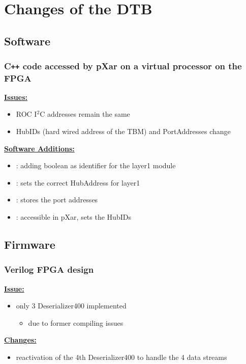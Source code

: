 \documentclass[9pt]{beamer}
\begin{document}
\section{Changes of the DTB}
\subsection{Software}
\begin{frame}
	\frametitle{C\texttt{++} code accessed by pXar on a virtual processor on the FPGA}
	\underline{\textbf{Issues:}}
	\begin{itemize}
		\setlength{\itemsep}{\fill}
		\item ROC I$^{2}$C addresses remain the same
		\item HubIDs (hard wired address of the TBM) and PortAddresses change
	\end{itemize}
	\vspace*{10pt}
	\underline{\textbf{Software Additions:}}
	\begin{itemize}
		\setlength{\itemsep}{\fill}
		\item {}: adding boolean as identifier for the layer1 module
		\item {}: sets the correct HubAddress for layer1
		\item {}: stores the port addresses
		\item {}: accessible in pXar, sets the HubIDs
	\end{itemize}
\end{frame}
\subsection{Firmware}
\begin{frame}
	\frametitle{Verilog FPGA design}
	\underline{\textbf{Issue:}}
	\begin{itemize}
		\item only $3$ Deserializer400 implemented
		\begin{itemize}
			\item due to former compiling issues
		\end{itemize}
	\end{itemize}
	\vspace*{10pt}
	\underline{\textbf{Changes:}}
	\begin{itemize}
		\item reactivation of the 4th Deserializer400 to handle the 4 data streams
	\end{itemize}
\end{frame}
\end{document}
